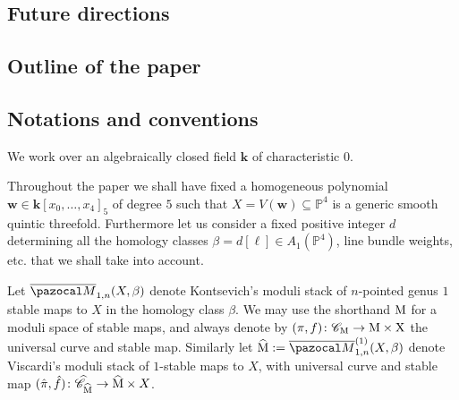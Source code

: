 \documentclass[11pt]{amsart}
\newcommand{\M}[4]{\overline{\pazocal M}_{#1,#2}(#3,#4)}
\newcommand{\PP}{\mathbb P}
\renewcommand{\k}{\mathbf k}
\renewcommand{\to}{\rightarrow}
\newcommand{\cC}{\mathcal C}
\newcommand{\hC}{\widehat{\mathcal C}}
\newcommand{\hrM}{\widehat{\rm{M}}}
\newcommand{\oM}{\overline{\pazocal M}}
\theoremstyle{plain}
\theoremstyle{definition}
\begin{document}
\subsection*{Future directions}

\subsection*{Outline of the paper}

\subsection*{Notations and conventions} We work over an algebraically closed field $\k$ of characteristic $0$.

Throughout the paper we shall have fixed a homogeneous polynomial $\mathbf w\in\k[x_0,\ldots,x_4]_5$ of degree $5$ such that $X=V(\mathbf w)\subseteq\PP^4$ is a generic smooth quintic threefold. Furthermore let us consider a fixed positive integer $d$ determining all the homology classes $\beta=d[\ell]\in A_1(\PP^4)$, line bundle weights, etc. that we shall take into account.

Let $\M{1}{n}{X}{\beta}$ denote Kontsevich's moduli stack of $n$-pointed genus $1$ stable maps to $X$ in the homology class $\beta$. We may use the shorthand $\rm M$ for a moduli space of stable maps, and always denote by $(\pi,f)\colon\cC_{\rm M}\to \rm M\times X$ the universal curve and stable map. Similarly let $\hrM:=\oM_{1,n}^{(1)}(X,\beta)$ denote Viscardi's moduli stack of $1$-stable maps to $X$, with universal curve and stable map $(\hat\pi,\hat f)\colon\hC_{\hrM}\to \hrM\times X$.
\end{document}
